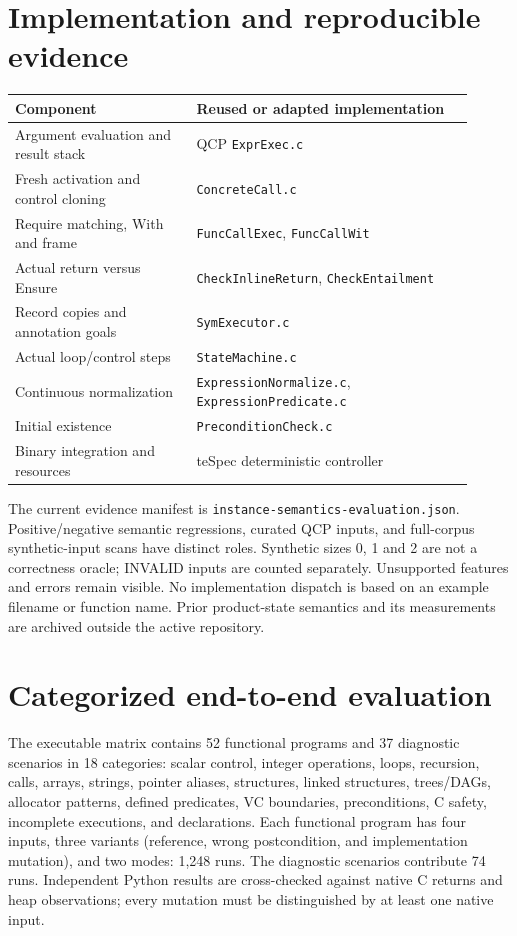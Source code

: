 \documentclass[10pt]{article}
\begin{document}
\section{Implementation and reproducible evidence}
\begin{center}
\begin{tabular}{p{0.36\linewidth}p{0.55\linewidth}}
\toprule
Component & Reused or adapted implementation\\
\midrule
Argument evaluation and result stack & QCP \texttt{ExprExec.c}\\
Fresh activation and control cloning & \texttt{ConcreteCall.c}\\
Require matching, With and frame & \texttt{FuncCallExec}, \texttt{FuncCallWit}\\
Actual return versus Ensure & \texttt{CheckInlineReturn}, \texttt{CheckEntailment}\\
Record copies and annotation goals & \texttt{SymExecutor.c}\\
Actual loop/control steps & \texttt{StateMachine.c}\\
Continuous normalization & \texttt{ExpressionNormalize.c}, \texttt{ExpressionPredicate.c}\\
Initial existence & \texttt{PreconditionCheck.c}\\
Binary integration and resources & teSpec deterministic controller\\
\bottomrule
\end{tabular}
\end{center}
The current evidence manifest is \texttt{instance-semantics-evaluation.json}.
Positive/negative semantic regressions, curated QCP inputs, and full-corpus
synthetic-input scans have distinct roles. Synthetic sizes 0, 1 and 2 are not
a correctness oracle; INVALID inputs are counted separately. Unsupported
features and errors remain visible. No implementation dispatch is based on an
example filename or function name. Prior product-state semantics and its
measurements are archived outside the active repository.
\section{Categorized end-to-end evaluation}
The executable matrix contains 52 functional programs and 37 diagnostic
scenarios in 18 categories: scalar control, integer operations, loops,
recursion, calls, arrays, strings, pointer aliases, structures, linked
structures, trees/DAGs, allocator patterns, defined predicates, VC boundaries,
preconditions, C safety, incomplete executions, and declarations.
Each functional program has four inputs, three variants (reference, wrong
postcondition, and implementation mutation), and two modes: 1,248 runs.
The diagnostic scenarios contribute 74 runs. Independent Python results are
cross-checked against native C returns and heap observations; every mutation
must be distinguished by at least one native input.
\end{document}
